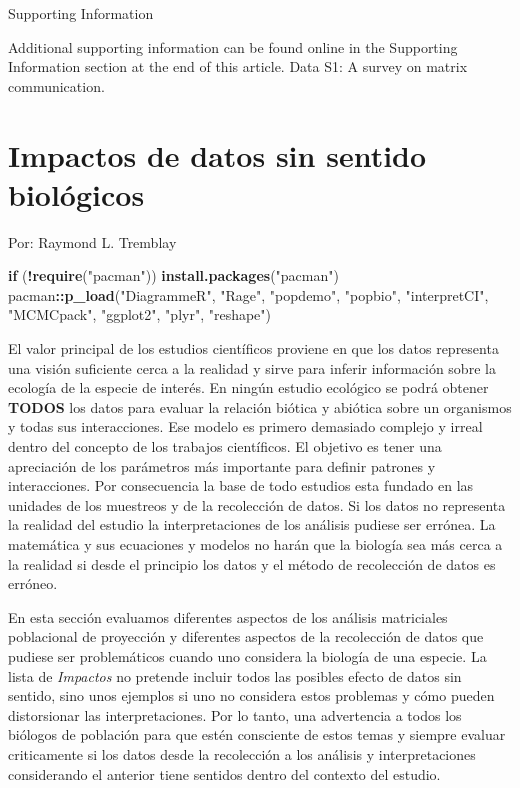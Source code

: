 \documentclass[
]{book}
\newenvironment{Shaded}{\begin{snugshade}}{\end{snugshade}}
\newcommand{\ControlFlowTok}[1]{\textcolor[rgb]{0.13,0.29,0.53}{\textbf{#1}}}
\newcommand{\FunctionTok}[1]{\textcolor[rgb]{0.13,0.29,0.53}{\textbf{#1}}}
\newcommand{\NormalTok}[1]{#1}
\newcommand{\SpecialCharTok}[1]{\textcolor[rgb]{0.81,0.36,0.00}{\textbf{#1}}}
\newcommand{\StringTok}[1]{\textcolor[rgb]{0.31,0.60,0.02}{#1}}
\theoremstyle{definition}
\theoremstyle{definition}
\theoremstyle{definition}
\theoremstyle{definition}
\theoremstyle{remark}
\begin{document}
Supporting Information

Additional supporting information can be found online in the
Supporting Information section at the end of this article.
Data S1: A survey on matrix communication.

\chapter{Impactos de datos sin sentido biológicos}\label{impactos-de-datos-sin-sentido-bioluxf3gicos}

Por: Raymond L. Tremblay

\begin{Shaded}
\begin{Highlighting}[]
\ControlFlowTok{if}\NormalTok{ (}\SpecialCharTok{!}\FunctionTok{require}\NormalTok{(}\StringTok{"pacman"}\NormalTok{)) }\FunctionTok{install.packages}\NormalTok{(}\StringTok{"pacman"}\NormalTok{)}
\NormalTok{pacman}\SpecialCharTok{::}\FunctionTok{p\_load}\NormalTok{(}\StringTok{"DiagrammeR"}\NormalTok{, }\StringTok{"Rage"}\NormalTok{, }\StringTok{"popdemo"}\NormalTok{, }\StringTok{"popbio"}\NormalTok{, }\StringTok{"interpretCI"}\NormalTok{, }
               \StringTok{"MCMCpack"}\NormalTok{, }\StringTok{"ggplot2"}\NormalTok{, }\StringTok{"plyr"}\NormalTok{, }\StringTok{"reshape"}\NormalTok{)}
\end{Highlighting}
\end{Shaded}

El valor principal de los estudios científicos proviene en que los datos representa una visión suficiente cerca a la realidad y sirve para inferir información sobre la ecología de la especie de interés. En ningún estudio ecológico se podrá obtener \textbf{TODOS} los datos para evaluar la relación biótica y abiótica sobre un organismos y todas sus interacciones. Ese modelo es primero demasiado complejo y irreal dentro del concepto de los trabajos científicos. El objetivo es tener una apreciación de los parámetros más importante para definir patrones y interacciones. Por consecuencia la base de todo estudios esta fundado en las unidades de los muestreos y de la recolección de datos. Si los datos no representa la realidad del estudio la interpretaciones de los análisis pudiese ser errónea. La matemática y sus ecuaciones y modelos no harán que la biología sea más cerca a la realidad si desde el principio los datos y el método de recolección de datos es erróneo.

En esta sección evaluamos diferentes aspectos de los análisis matriciales poblacional de proyección y diferentes aspectos de la recolección de datos que pudiese ser problemáticos cuando uno considera la biología de una especie. La lista de \emph{Impactos} no pretende incluir todos las posibles efecto de datos sin sentido, sino unos ejemplos si uno no considera estos problemas y cómo pueden distorsionar las interpretaciones. Por lo tanto, una advertencia a todos los biólogos de población para que estén consciente de estos temas y siempre evaluar criticamente si los datos desde la recolección a los análisis y interpretaciones considerando el anterior tiene sentidos dentro del contexto del estudio.
\end{document}
